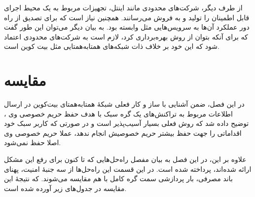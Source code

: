 از طرف دیگر، شرکت‌های محدودی مانند اینتل، تجهیزات مربوط به یک محیط اجرای قابل اطمینان را تولید و به فروش می‌رسانند. همچنین نیاز است که برای  تصدیق از راه دور عملکرد آن‌ها به سرویس‌هایی مثل \cite{EPID} وابسته بود. به بیان دیگر می‌توان این طور گفت که برای آنکه بتوان از روش \cite{Matetic2019} بهره‌برداری کرد، لازم است به شرکت‌های محدودی اعتماد شود که این خود بر خلاف ذات شبکه‌های همتابه‌همتایی مثل بیت کوین است.



\section{مقایسه}

در این فصل، ضمن آشنایی با ساز و کار فعلی شبکه‌ٔ همتا‌به‌همتای بیت‌کوین در ارسال اطلاعات مربوط به تراکنش‌های یک گره سبک با هدف حفظ حریم خصوصی وی \cite{Hearn2013}، توضیح داده شد که روش فعلی بسیار آسیب‌پذیر است و در صورتی که کاربر سبک خود اقداماتی را جهت حفظ بیشتر حریم خصوصیش انجام ندهد، عملا حریم خصوصی وی اصلا حفظ نمی‌شود.

علاوه بر این، در این فصل به بیان مفصل راه‌حل‌هایی که تا کنون برای رفع این مشکل ارائه شده‌اند، پرداخته شده است. در این قسمت این راه‌حل‌ها از سه جنبهٔ امنیت، پهنای باند مصرفی، بار پردازشی سمت گره کامل با هم مقایسه می‌شوند. که نتیجهٔ این مقایسه در جدول‌های زیر آورده شده است.

